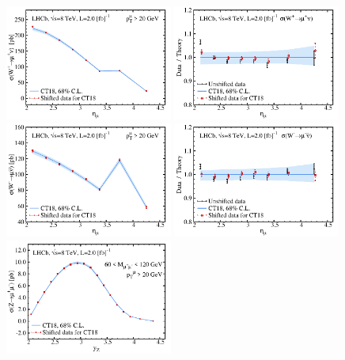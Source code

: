 \begin{figure}[tbp]
	\includegraphics[width=0.49\textwidth]{./fig/data_250_CT18__1_abs_ect.pdf}
	\includegraphics[width=0.49\textwidth]{./fig/data_250_CT18__1_DoT_ect.pdf}
	\includegraphics[width=0.49\textwidth]{./fig/data_250_CT18__2_abs_ect.pdf}
	\includegraphics[width=0.49\textwidth]{./fig/data_250_CT18__2_DoT_ect.pdf}
	\includegraphics[width=0.49\textwidth]{./fig/data_250_CT18__3_abs_ect.pdf}

\end{figure}
